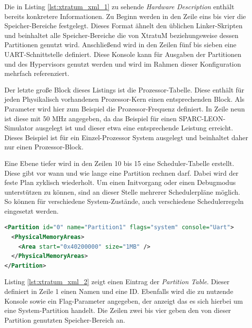 \documentclass[
  a4paper,					    %
  twoside,
  DIV=calc,     				%
  bibliography=totoc,
  cleardoublepage=empty,
  ngerman,     					%
  final       					%
]{scrbook}
\begin{document}
Die in Listing \ref{lst:xtratum_xml_1} zu sehende \emph{Hardware Description} enthält bereits konkretere Informationen. Zu Beginn werden in den Zeile eins bis vier die Speicher-Bereiche festgelegt. Dieses Format ähnelt den üblichen Linker-Skripten und beinhaltet alle Speicher-Bereiche die von XtratuM beziehungsweise dessen Partitionen genutzt wird. Anschließend wird in den Zeilen fünf bis sieben eine UART-Schnittstelle definiert. Diese Konsole kann für Ausgaben der Partitionen und des Hypervisors genutzt werden und wird im Rahmen dieser Konfiguration mehrfach referenziert.

Der letzte große Block dieses Listings ist die Prozessor-Tabelle. Diese enthält für jeden Physikalisch vorhandenen Prozessor-Kern einen entsprechenden Block. Als Parameter wird hier zum Beispiel die Prozessor-Frequenz definiert. In Zeile neun ist diese mit 50 MHz angegeben, da das Beispiel für einen SPARC-LEON-Simulator ausgelegt ist und dieser etwa eine entsprechende Leistung erreicht. Dieses Beispiel ist für ein Einzel-Prozessor System ausgelegt und beinhaltet daher nur einen Prozessor-Block.

Eine Ebene tiefer wird in den Zeilen 10 bis 15 eine Scheduler-Tabelle erstellt. Diese gibt vor wann und wie lange eine Partition rechnen darf. Dabei wird der feste Plan zyklisch wiederholt. Um einen Initvorgang oder einen Debugmodus unterstützen zu können, sind an dieser Stelle mehrerer Schedulerpläne möglich. So können für verschiedene System-Zustände, auch verschiedene Schedulerregeln eingesetzt werden.

\begin{lstlisting}[frame=single, language=XML, basicstyle=\footnotesize, caption={XtratuM Partition Table}, label={lst:xtratum_xml_2}]
<Partition id="0" name="Partition1" flags="system" console="Uart">
  <PhysicalMemoryAreas>
    <Area start="0x40200000" size="1MB" />
  </PhysicalMemoryAreas>
</Partition>
\end{lstlisting}

Listing \ref{lst:xtratum_xml_2} zeigt einen Eintrag der \emph{Partition Table}. Dieser definiert in Zeile 1 einen Namen und eine ID. Ebenfalls wird die zu nutzende Konsole sowie ein Flag-Parameter angegeben, der anzeigt das es sich hierbei um eine System-Partition handelt. Die Zeilen zwei bis vier geben den von dieser Partition genutzten Speicher-Bereich an.
\end{document}
